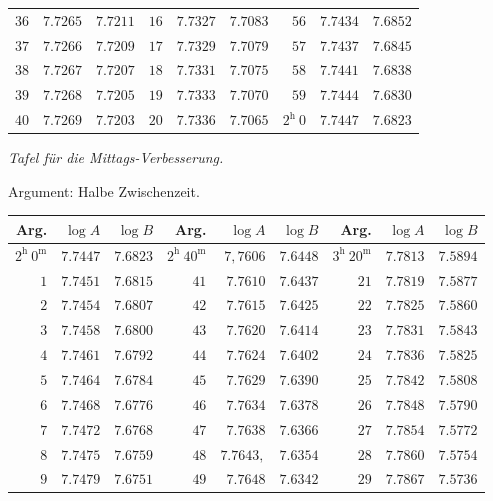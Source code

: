 \begin{center}
\begin{tabular}{r|r|r||r|r|r||r|r|r}
$36$ & $7.7265$ & $7.7211$ & $16$ & $7.7327$ & $7.7083$ & $56$ & $7.7434$ & $7.6852$\\
$37$ & $7.7266$ & $7.7209$ & $17$ & $7.7329$ & $7.7079$ & $57$ & $7.7437$ & $7.6845$\\
$38$ & $7.7267$ & $7.7207$ & $18$ & $7.7331$ & $7.7075$ & $58$ & $7.7441$ & $7.6838$\\
$39$ & $7.7268$ & $7.7205$ & $19$ & $7.7333$ & $7.7070$ & $59$ & $7.7444$ & $7.6830$\\
$40$ & $7.7269$ & $7.7203$ & $20$ & $7.7336$ & $7.7065$ & $2^{\mathrm h}\ 0$ & $7.7447$ & $7.6823$\\
\end{tabular}
\endgroup
\end{center}
\clearpage{}%
\begin{center}
\emph{Tafel für die Mittags-Verbesserung.}\par\medskip
Argument: Halbe Zwischenzeit.\par\medskip
\begingroup\fontsize{9}{10.2}\selectfont\setlength{\tabcolsep}{3pt}
\begin{tabular}{r|r|r||r|r|r||r|r|r}
Arg. & $\log A$ & $\log B$ & Arg. & $\log A$ & $\log B$ & Arg. & $\log A$ & $\log B$\\\hline
$2^{\mathrm h}\ 0^{\mathrm m}$ & $7.7447$ & $7.6823$ & $2^{\mathrm h}\ 40^{\mathrm m}$ & $7{,}7606$ & $7.6448$ & $3^{\mathrm h}\ 20^{\mathrm m}$ & $7.7813$ & $7.5894$\\
$1$ & $7.7451$ & $7.6815$ & $41$ & $7.7610$ & $7.6437$ & $21$ & $7.7819$ & $7.5877$\\
$2$ & $7.7454$ & $7.6807$ & $42$ & $7.7615$ & $7.6425$ & $22$ & $7.7825$ & $7.5860$\\
$3$ & $7.7458$ & $7.6800$ & $43$ & $7.7620$ & $7.6414$ & $23$ & $7.7831$ & $7.5843$\\
$4$ & $7.7461$ & $7.6792$ & $44$ & $7.7624$ & $7.6402$ & $24$ & $7.7836$ & $7.5825$\\
$5$ & $7.7464$ & $7.6784$ & $45$ & $7.7629$ & $7.6390$ & $25$ & $7.7842$ & $7.5808$\\
$6$ & $7.7468$ & $7.6776$ & $46$ & $7.7634$ & $7.6378$ & $26$ & $7.7848$ & $7.5790$\\
$7$ & $7.7472$ & $7.6768$ & $47$ & $7.7638$ & $7.6366$ & $27$ & $7.7854$ & $7.5772$\\
$8$ & $7.7475$ & $7.6759$ & $48$ & $7.7643{,}$ & $7.6354$ & $28$ & $7.7860$ & $7.5754$\\
$9$ & $7.7479$ & $7.6751$ & $49$ & $7.7648$ & $7.6342$ & $29$ & $7.7867$ & $7.5736$\\

\end{tabular}
\end{center}

